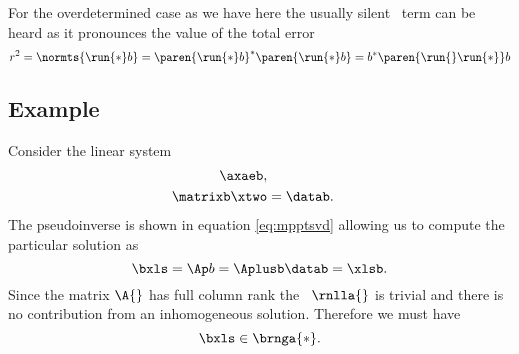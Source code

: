 For the overdetermined case as we have here the usually silent \ns \ term can be heard as it pronounces the value of the total error
\begin{equation}
  r^{2} = \normts{ \run{*} b  } = \paren{ \run{*} b  }^{*} \paren{ \run{*} b  } = b^{*} \paren{ \run{}\run{*} } b 
  \label{eq:r2:a}
\end{equation}


\subsection{Example}
Consider the linear system
\begin{equation}
  \begin{split}
    \axaeb, \\
    \matrixb \xtwo &= \datab.
  \end{split}
\end{equation}
The pseudoinverse is shown in equation \eqref{eq:mpptsvd} allowing us to compute the particular solution as
\begin{equation}
  \bxls = \Ap b = \Aplusb \datab = \xlsb.
\end{equation}
Since the matrix $\A{}$ has full column rank the \ns \ $\rnlla{}$ is trivial and there is no contribution from an inhomogeneous solution. Therefore we must have
\begin{equation}
  \bxls \in \brnga{*}.
\end{equation}


